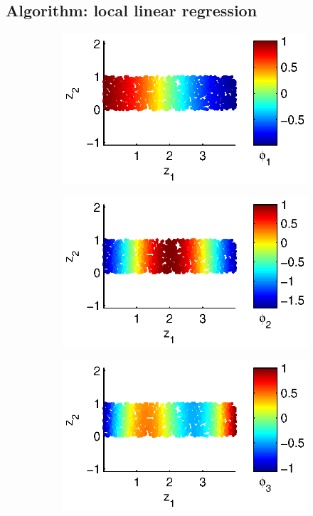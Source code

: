 \documentclass[3p]{elsarticle}
\begin{document}
\subsection{Algorithm: local linear regression}

\begin{figure}[t]
\centering
\begin{subfigure}{0.24\textwidth}
\includegraphics[width=\textwidth]{strip_discrete1}
\end{subfigure}
%
\begin{subfigure}{0.24\textwidth}
\includegraphics[width=\textwidth]{strip_discrete2}
\end{subfigure}
%
\begin{subfigure}{0.24\textwidth}
\includegraphics[width=\textwidth]{strip_discrete3}

\end{subfigure}
\end{figure}
\end{document}
